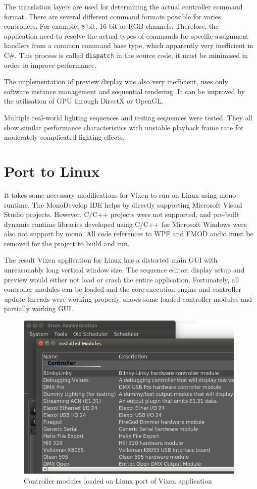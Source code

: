 The translation layers are used for determining the actual controller command format. There are several different command formats possible for varies controllers. For example, 8-bit, 16-bit or RGB channels. Therefore, the application need to resolve the actual types of commands for specific assignment handlers from a common command base type, which apparently very inefficient in C\#. This process is called \texttt{dispatch} in the source code, it must be minimised in order to improve performance. 

The implementation of preview display was also very inefficient, uses only software instance management and sequential rendering. It can be improved by the utilisation of GPU through DirectX or OpenGL.

Multiple real-world lighting sequences and testing sequences were tested. They all show similar performance characteristics with unstable playback frame rate for moderately complicated lighting effects.

\section{Port to Linux}

It takes some necessary modifications for Vixen to run on Linux using mono runtime. The MonoDevelop IDE \cite{monodevelop} helps by directly supporting Microsoft Visual Studio projects. However, C/C++ projects were not supported, and pre-built dynamic runtime libraries developed using C/C++ for Microsoft Windows were also not support by mono. All code references to WPF and FMOD audio must be removed for the project to build and run.

The result Vixen application for Linux has a distorted main GUI with unreasonably long vertical window size. The sequence editor, display setup and preview would either not load or crash the entire application. Fortunately, all controller modules can be loaded and the core execution engine and controller update threads were working properly.  shows some loaded controller modules and partially working GUI.

\begin{figure}[t]
  \centering
  \includegraphics[width=0.8\columnwidth]{Figs/vixen_linux_controllers.png}
  \caption{\footnotesize Controller modules loaded on Linux port of Vixen application}
  \label{fig:vixen_linux_main}
\end{figure}

